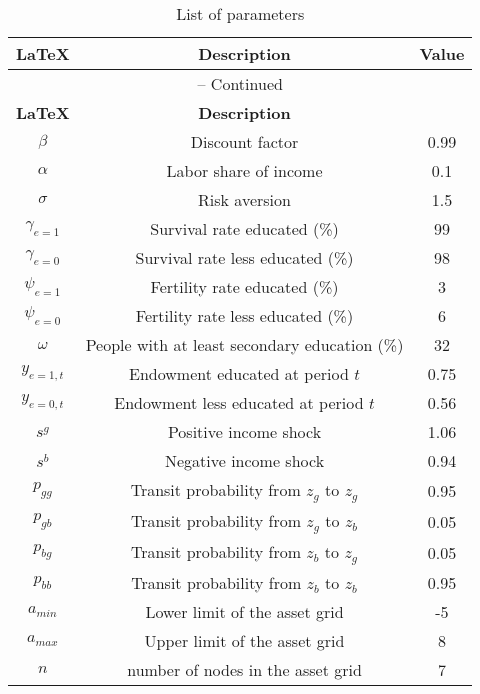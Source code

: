 \begin{center}
\begin{longtable}{ccc}
\caption{List of parameters}\\%
\hline%
\multicolumn{1}{c}{\textbf{\LaTeX}} &
\multicolumn{1}{c}{\textbf{Description}} &
\multicolumn{1}{c}{\textbf{Value}}\\%
\hline\hline%
\endfirsthead
\multicolumn{3}{c}{{\tablename} \thetable{} -- Continued}\\%
\hline%
\multicolumn{1}{c}{\textbf{\LaTeX}} &
\multicolumn{1}{c}{\textbf{Description}}\\%
\hline\hline%
\endhead
${\beta}$ & Discount factor & 0.99\\
${\alpha}$ & Labor share of income & 0.1\\
${\sigma}$ & Risk aversion & 1.5 \\
${\gamma_{e=1}}$ & Survival rate educated (\%) & 99\\
${\gamma_{e=0}}$ & Survival rate less educated (\%) & 98\\
${\psi_{e=1}}$ & Fertility rate educated (\%) & 3\\
${\psi_{e=0}}$ & Fertility rate less educated (\%) & 6\\
${\omega}$ & People with at least secondary education (\%) & 32\\
${y_{e=1,t}}$ & Endowment educated at period $t$ & 0.75\\
${y_{e=0,t}}$ & Endowment less educated at period $t$ & 0.56\\
$s^{g}$ & Positive income shock & 1.06\\
$s^{b}$ & Negative income shock & 0.94\\
$p_{gg}$ & Transit probability from $z_{g}$ to $z_{g}$ & 0.95\\
$p_{gb}$ & Transit probability from $z_{g}$ to $z_{b}$ & 0.05\\
$p_{bg}$ & Transit probability from $z_{b}$ to $z_{g}$ & 0.05\\
$p_{bb}$ & Transit probability from $z_{b}$ to $z_{b}$ & 0.95\\
$a_{min}$ & Lower limit of the asset grid & -5 \\
$a_{max}$ & Upper limit of the asset grid & 8\\
$n$ & number of nodes in the asset grid& 7\\

\hline%
\end{longtable}
\end{center}